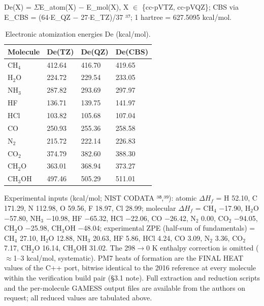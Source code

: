 \documentclass[preprint,12pt]{elsarticle}
\begin{document}
De(X) = $\Sigma$E\_atom(X) $-$ E\_mol(X), X $\in$ \{cc-pVTZ, cc-pVQZ\}; CBS via E\_CBS = (64$\cdot$E\_QZ $-$ 27$\cdot$E\_TZ)/37 ³⁷; 1 hartree = 627.5095 kcal/mol.

\begin{table}[htbp]
\centering
\caption{Electronic atomization energies De (kcal/mol).}
\label{tab:Electronicatomiz}
\begin{tabular}{llll}
\hline
\textbf{Molecule} & \textbf{De(TZ)} & \textbf{De(QZ)} & \textbf{De(CBS)} \\
\hline
CH$_{4}$ & 412.64 & 416.70 & 419.65 \\
H$_{2}$O & 224.72 & 229.54 & 233.05 \\
NH$_{3}$ & 287.82 & 293.69 & 297.97 \\
HF & 136.71 & 139.75 & 141.97 \\
HCl & 103.82 & 105.68 & 107.04 \\
CO & 250.93 & 255.36 & 258.58 \\
N$_{2}$ & 215.72 & 222.14 & 226.83 \\
CO$_{2}$ & 374.79 & 382.60 & 388.30 \\
CH$_{2}$O & 363.01 & 368.94 & 373.27 \\
CH$_{3}$OH & 497.46 & 505.29 & 511.01 \\
\hline
\end{tabular}
\end{table}

Experimental inputs (kcal/mol; NIST CODATA ³⁸,³⁹): atomic $\Delta H_f$ = H 52.10, C 171.29, N 112.98, O 59.56, F 18.97, Cl 28.99; molecular $\Delta H_f$ = CH$_{4}$ $-$17.90, H$_{2}$O $-$57.80, NH$_{3}$ $-$10.98, HF $-$65.32, HCl $-$22.06, CO $-$26.42, N$_{2}$ 0.00, CO$_{2}$ $-$94.05, CH$_{2}$O $-$25.98, CH$_{3}$OH $-$48.04; experimental ZPE (half-sum of fundamentals) = CH$_{4}$ 27.10, H$_{2}$O 12.88, NH$_{3}$ 20.63, HF 5.86, HCl 4.24, CO 3.09, N$_{2}$ 3.36, CO$_{2}$ 7.17, CH$_{2}$O 16.14, CH$_{3}$OH 31.02. The 298$\rightarrow$0 K enthalpy correction is omitted ($\approx$1--3 kcal/mol, systematic). PM7 heats of formation are the FINAL HEAT values of the C++ port, bitwise identical to the 2016 reference at every molecule within the verification build pair (\S{}3.1 note). Full extraction and reduction scripts and the per-molecule GAMESS output files are available from the authors on request; all reduced values are tabulated above.
\end{document}
